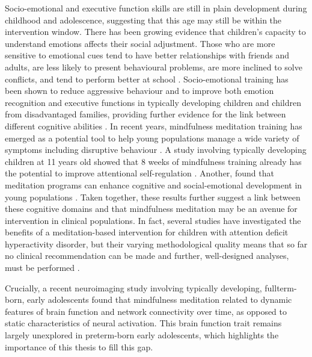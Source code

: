 Socio-emotional and executive function skills are still in plain development during childhood and adolescence, suggesting that this age may still be within the intervention window. There has been growing evidence that children's capacity to understand emotions affects their social adjustment. Those who are more sensitive to emotional cues tend to have better relationships with friends and adults, are less likely to present behavioural problems, are more inclined to solve conflicts, and tend to perform better at school \citep{Denham2006,Domitrovich2007, Harrington2020}. Socio-emotional training has been shown to reduce aggressive behaviour and to improve both emotion recognition and executive functions in typically developing children and children from disadvantaged families, providing further evidence for the link between different cognitive abilities \citep{Pons2002,Sprung2015, Grazzani2018, DeMooij2020}. In recent years, mindfulness meditation training has emerged as a potential tool to help young populations manage a wide variety of symptoms including disruptive behaviour \citep{Perry-Parrish2016}. A study involving typically developing children at 11 years old showed that 8 weeks of mindfulness training already has the potential to improve attentional self-regulation \citep{Felver2017}. Another, found that meditation programs can enhance cognitive and social-emotional development in young populations \citep{Schonert-Reichl2015}. Taken together, these results further suggest a link between these cognitive domains and that mindfulness meditation may be an avenue for intervention in clinical populations. In fact, several studies have investigated the benefits of a meditation-based intervention for children with attention deficit hyperactivity disorder, but their varying methodological quality means that so far no clinical recommendation can be made and further, well-designed analyses, must be performed \citep{Evans2018}.

Crucially, a recent neuroimaging study involving typically developing, fullterm-born, early adolescents found that mindfulness meditation related to dynamic features of brain function and network connectivity over time, as opposed to static characteristics of neural activation\citep{Marusak2018}. This brain function trait remains largely unexplored in preterm-born early adolescents, which highlights the importance of this thesis to fill this gap.




